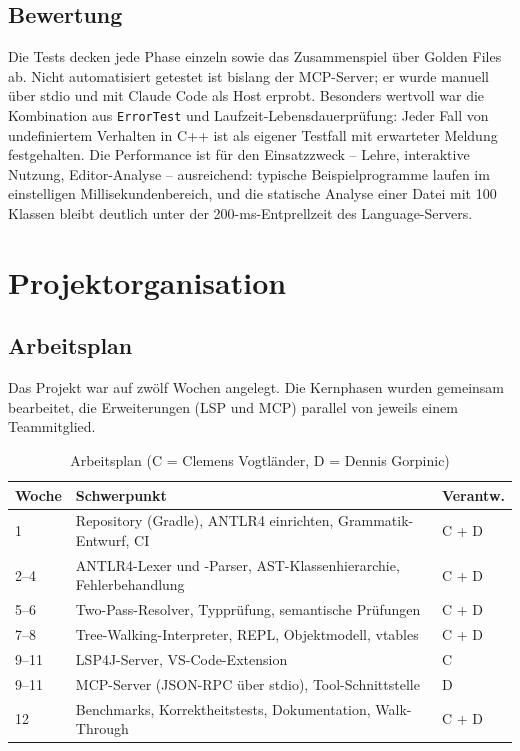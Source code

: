 \documentclass[11pt,a4paper,parskip=half,headsepline,toc=flat]{scrartcl}
\newcommand{\code}[1]{\texttt{#1}}
\newcommand{\thead}{\rowcolor{headbg}}
\newcommand{\hcell}[1]{\textbf{\color{navy}#1}}
\newenvironment{reporttable}[1][]%
  {\begin{table}[htbp]\centering\small\renewcommand{\arraystretch}{1.25}\rowcolors{2}{white}{zebra}}%
  {\end{table}}
\begin{document}
\subsection{Bewertung}
Die Tests decken jede Phase einzeln sowie das Zusammenspiel über Golden Files ab. Nicht automatisiert getestet ist
bislang der MCP-Server; er wurde manuell über stdio und mit Claude Code als Host erprobt. Besonders
wertvoll war die Kombination aus \code{ErrorTest} und Laufzeit-Lebensdauerprüfung: Jeder Fall von undefiniertem
Verhalten in C++ ist als eigener Testfall mit erwarteter Meldung festgehalten. Die Performance ist für den
Einsatzzweck -- Lehre, interaktive Nutzung, Editor-Analyse -- ausreichend: typische Beispielprogramme laufen im
einstelligen Millisekundenbereich, und die statische Analyse einer Datei mit 100 Klassen bleibt deutlich unter der
200-ms-Entprellzeit des Language-Servers.

\section{Projektorganisation}\label{sec:organisation}
\subsection{Arbeitsplan}
Das Projekt war auf zwölf Wochen angelegt. Die Kernphasen wurden gemeinsam bearbeitet, die Erweiterungen (LSP und
MCP) parallel von jeweils einem Teammitglied.

\begin{reporttable}
\begin{tabular}{L{0.1}L{0.68}L{0.14}}
\thead \hcell{Woche} & \hcell{Schwerpunkt} & \hcell{Verantw.} \\  & Repository (Gradle), ANTLR4 einrichten, Grammatik-Entwurf, CI & C + D \\
2--4 & ANTLR4-Lexer und -Parser, AST-Klassenhierarchie, Fehlerbehandlung & C + D \\
5--6 & Two-Pass-Resolver, Typprüfung, semantische Prüfungen & C + D \\
7--8 & Tree-Walking-Interpreter, REPL, Objektmodell, vtables & C + D \\
9--11 & LSP4J-Server, VS-Code-Extension & C \\
9--11 & MCP-Server (JSON-RPC über stdio), Tool-Schnittstelle & D \\
12 & Benchmarks, Korrektheitstests, Dokumentation, Walk-Through & C + D \\ \bottomrule
\end{tabular}
\caption{Arbeitsplan (C = Clemens Vogtländer, D = Dennis Gorpinic)}
\end{reporttable}
\end{document}

